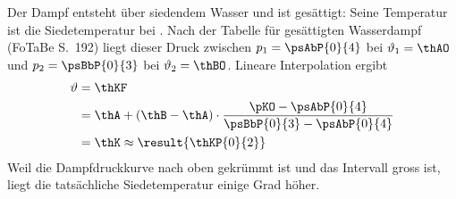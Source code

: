 Der Dampf entsteht über siedendem Wasser und ist gesättigt: Seine Temperatur ist die Siedetemperatur bei \pKO. Nach der Tabelle für gesättigten Wasserdampf (FoTaBe S.~192) liegt dieser Druck zwischen $p_1 = \psAbP{0}{4}$ bei $\vartheta_1 = \thAO$ und $p_2 = \psBbP{0}{3}$ bei $\vartheta_2 = \thBO$. Lineare Interpolation ergibt
\begin{align}
 \vartheta &= \thKF \\
   &= \thA + \left(\thB-\thA\right)\cdot\frac{\pKO-\psAbP{0}{4}}{\psBbP{0}{3}-\psAbP{0}{4}} \\
   &= \thK \approx \result{\thKP{0}{2}}
\end{align}
Weil die Dampfdruckkurve nach oben gekrümmt ist und das Intervall gross ist, liegt die tatsächliche Siedetemperatur einige Grad höher.
